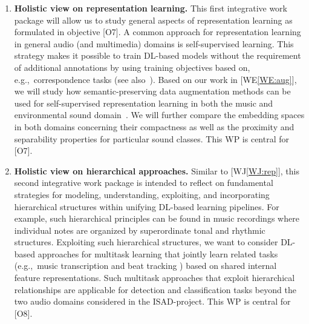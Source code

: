 \documentclass[11pt,a4paper]{article}
\def\PN{\mathrm{ISAD}}
\newcommand{\egc}{e.g.,\ }
\theoremstyle{plain} \newtheorem{define}{Definition}[section]
\begin{document}
{\begin{enumerate}[itemindent=0.5cm]
\item  \label{WJ:rep}
\textbf{Holistic view on representation learning.} 
%
This first integrative work package will allow us to study general aspects of representation learning as formulated in objective [O7]. A common approach for representation learning in general audio (and multimedia) domains is self-supervised learning. This strategy makes it possible to train DL-based models without the requirement of additional annotations by using training objectives based on, \egc correspondence tasks (see also~\cite{Cramer:2019:OpenL3:ICASSP}).
%
Based on our work in [WE\ref{WE:aug}], we will study how semantic-preserving data augmentation methods can be used for self-supervised representation learning in both the music and environmental sound domain~\cite{Fonseca:2021:SSLSeparation:ARXIV}. We will further compare the embedding spaces in both domains concerning their compactness as well as the proximity and separability properties for particular sound classes.
%
This WP is central for [O7].

\item  \label{WJ:hierarch}
\textbf{Holistic view on hierarchical approaches.} 
%
Similar to [WJ\ref{WJ:rep}], this second integrative work package is intended to reflect on fundamental strategies for modeling, understanding, exploiting, and incorporating hierarchical structures within unifying DL-based learning pipelines. For example, such hierarchical principles can be found in music recordings where individual notes are organized by superordinate tonal and rhythmic structures.
%
Exploiting such hierarchical structures, we want to consider DL-based approaches for multitask learning that jointly learn related tasks (\egc music transcription and beat tracking \cite{Vogl:2017:DrumAndBeat:ISMIR}) based on shared internal feature representations.
%
Such multitask approaches that exploit hierarchical relationships are applicable for detection and classification tasks beyond the two audio domains considered in the $\PN$-project.
%
This WP is central for [O8].


\end{enumerate}}
\end{document}
